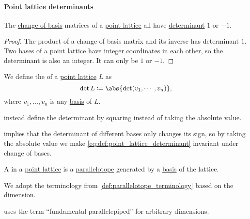 \paragraph{Point lattice determinants}

\begin{proposition}\label{thm:point_lattice_determinant}
  The \hyperref[con:change_of_basis]{change of basis} matrices of a \hyperref[def:point_lattice]{point lattice} all have \hyperref[def:matrix_determinant]{determinant} \( 1 \) or \( -1 \).
\end{proposition}
\begin{proof}
  The product of a change of basis matrix and its inverse has determinant \( 1 \). Two bases of a point lattice have integer coordinates in each other, so the determinant is also an integer. It can only be \( 1 \) or \( -1 \).
\end{proof}

\begin{definition}\label{def:point_lattice_determinant}
  We define the  of a \hyperref[def:point_lattice]{point lattice} \( L \) as
  \begin{equation}\label{eq:def:point_lattice_determinant}
    \det L \coloneqq \abs{ \det(v_1, \cdots, v_n) },
  \end{equation}
  where \( v_1, \ldots, v_n \) is any \hyperref[def:point_lattice_basis]{basis} of \( L \).
\end{definition}
\begin{comments}
  \item {} instead define the determinant by squaring instead of taking the absolute value.
\end{comments}
\begin{defproof}
   implies that the determinant of different bases only changes its sign, so by taking the absolute value we make \eqref{eq:def:point_lattice_determinant} invariant under change of bases.
\end{defproof}

\begin{definition}\label{def:fundamental_parallelotope}
  A  in a \hyperref[def:point_lattice]{point lattice} is a \hyperref[def:parallelotope]{parallelotope} generated by a \hyperref[def:point_lattice_basis]{basis} of the lattice.

  We adopt the terminology from \cref{def:parallelotope_terminology} based on the dimension.
\end{definition}
\begin{comments}
  \item {} uses the term \enquote{fundamental parallelepiped} for arbitrary dimensions.
\end{comments}

